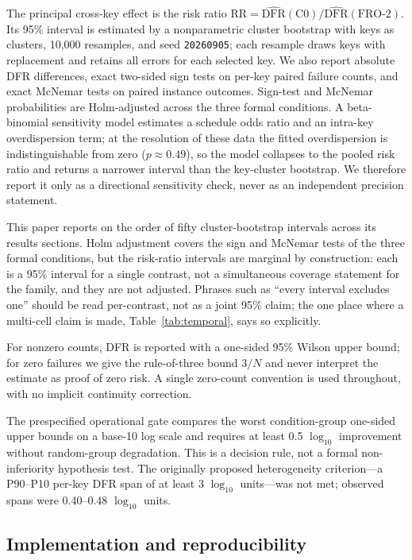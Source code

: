 \documentclass[lettersize,journal]{IEEEtran}
\begin{document}
The principal cross-key effect is the risk ratio $\mathrm{RR}=\widehat{\mathrm{DFR}}(\mathrm{C0})/\widehat{\mathrm{DFR}}(\mathrm{FRO\text{-}2})$. Its 95\% interval is estimated by a nonparametric cluster bootstrap with keys as clusters, 10{,}000 resamples, and seed \texttt{20260905}; each resample draws keys with replacement and retains all errors for each selected key. We also report absolute DFR differences, exact two-sided sign tests on per-key paired failure counts, and exact McNemar tests on paired instance outcomes. Sign-test and McNemar probabilities are Holm-adjusted across the three formal conditions. A beta-binomial sensitivity model estimates a schedule odds ratio and an intra-key overdispersion term; at the resolution of these data the fitted overdispersion is indistinguishable from zero ($p\approx0.49$), so the model collapses to the pooled risk ratio and returns a narrower interval than the key-cluster bootstrap. We therefore report it only as a directional sensitivity check, never as an independent precision statement.

This paper reports on the order of fifty cluster-bootstrap intervals across its results sections. Holm adjustment covers the sign and McNemar tests of the three formal conditions, but the risk-ratio intervals are marginal by construction: each is a 95\% interval for a single contrast, not a simultaneous coverage statement for the family, and they are not adjusted. Phrases such as ``every interval excludes one'' should be read per-contrast, not as a joint 95\% claim; the one place where a multi-cell claim is made, Table~\ref{tab:temporal}, says so explicitly.

For nonzero counts, DFR is reported with a one-sided 95\% Wilson upper bound; for zero failures we give the rule-of-three bound $3/N$ and never interpret the estimate as proof of zero risk. A single zero-count convention is used throughout, with no implicit continuity correction.

The prespecified operational gate compares the worst condition-group one-sided upper bounds on a base-10 log scale and requires at least 0.5 $\log_{10}$ improvement without random-group degradation. This is a decision rule, not a formal non-inferiority hypothesis test. The originally proposed heterogeneity criterion---a P90--P10 per-key DFR span of at least 3 $\log_{10}$ units---was not met; observed spans were 0.40--0.48 $\log_{10}$ units.

\subsection{Implementation and reproducibility}
\end{document}
